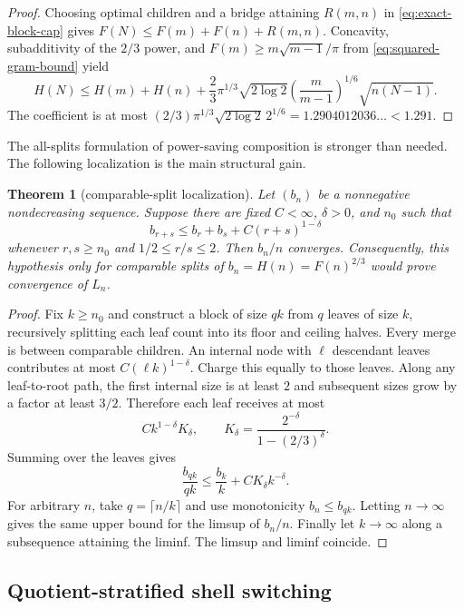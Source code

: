 \documentclass[11pt]{article}
\newtheorem{theorem}{Theorem}[section]
\theoremstyle{definition}
\theoremstyle{remark}
\begin{document}
\begin{proof}
Choosing optimal children and a bridge attaining $R(m,n)$ in
\eqref{eq:exact-block-cap} gives
$F(N)\le F(m)+F(n)+R(m,n)$.  Concavity, subadditivity of the
$2/3$ power, and $F(m)\ge m\sqrt{m-1}/\pi$ from
\eqref{eq:squared-gram-bound} yield
\[
 H(N)\le H(m)+H(n)
 +\frac23\pi^{1/3}\sqrt{2\log2}
 \left(\frac m{m-1}\right)^{1/6}\sqrt{n(N-1)}.
\]
The coefficient is at most
$(2/3)\pi^{1/3}\sqrt{2\log2}\,2^{1/6}
=1.2904012036\ldots<1.291$.
\end{proof}

The all-splits formulation of power-saving composition is stronger than
needed.  The following localization is the main structural gain.

\begin{theorem}[comparable-split localization]\label{thm:comparable-splits}
Let $(b_n)$ be a nonnegative nondecreasing sequence.  Suppose there are fixed
$C<\infty$, $\delta>0$, and $n_0$ such that
\[
 b_{r+s}\le b_r+b_s+C(r+s)^{1-\delta}
\]
whenever $r,s\ge n_0$ and $1/2\le r/s\le2$.  Then $b_n/n$ converges.
Consequently, this hypothesis only for comparable splits of
$b_n=H(n)=F(n)^{2/3}$ would prove convergence of $L_n$.
\end{theorem}

\begin{proof}
Fix $k\ge n_0$ and construct a block of size $qk$ from $q$ leaves of size
$k$, recursively splitting each leaf count into its floor and ceiling halves.
Every merge is between comparable children.  An internal node with $\ell$
descendant leaves contributes at most $C(\ell k)^{1-\delta}$.  Charge this
equally to those leaves.  Along any leaf-to-root path, the first internal size
is at least $2$ and subsequent sizes grow by a factor at least $3/2$.
Therefore each leaf receives at most
\[
 Ck^{1-\delta}K_\delta,
 \qquad
 K_\delta=\frac{2^{-\delta}}{1-(2/3)^\delta}.
\]
Summing over the leaves gives
\[
 \frac{b_{qk}}{qk}\le\frac{b_k}{k}+CK_\delta k^{-\delta}.
\]
For arbitrary $n$, take $q=\lceil n/k\rceil$ and use monotonicity
$b_n\le b_{qk}$.  Letting $n\to\infty$ gives the same upper bound for the
limsup of $b_n/n$.  Finally let $k\to\infty$ along a subsequence attaining
the liminf.  The limsup and liminf coincide.
\end{proof}

\subsection{Quotient-stratified shell switching}
\end{document}
